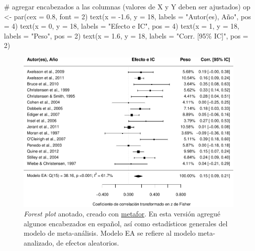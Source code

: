 \documentclass[
  bookmarksnumbered]{article}
\newenvironment{Shaded}{\begin{snugshade}}{\end{snugshade}}
\newcommand{\AttributeTok}[1]{\textcolor[rgb]{0.00,0.34,0.68}{#1}}
\newcommand{\CommentTok}[1]{\textcolor[rgb]{0.54,0.53,0.53}{#1}}
\newcommand{\DecValTok}[1]{\textcolor[rgb]{0.69,0.50,0.00}{#1}}
\newcommand{\FloatTok}[1]{\textcolor[rgb]{0.69,0.50,0.00}{#1}}
\newcommand{\FunctionTok}[1]{\textcolor[rgb]{0.39,0.29,0.61}{#1}}
\newcommand{\NormalTok}[1]{\textcolor[rgb]{0.12,0.11,0.11}{#1}}
\newcommand{\OtherTok}[1]{\textcolor[rgb]{0.00,0.43,0.16}{#1}}
\newcommand{\SpecialCharTok}[1]{\textcolor[rgb]{0.24,0.68,0.91}{#1}}
\newcommand{\StringTok}[1]{\textcolor[rgb]{0.75,0.01,0.01}{#1}}
\begin{document}
\begin{Shaded}
\begin{Highlighting}[]
\CommentTok{\# agregar encabezados a las columnas (valores de X y Y deben ser ajustados)}
\NormalTok{op }\OtherTok{\textless{}{-}} \FunctionTok{par}\NormalTok{(}\AttributeTok{cex =} \FloatTok{0.8}\NormalTok{, }\AttributeTok{font =} \DecValTok{2}\NormalTok{) }
\FunctionTok{text}\NormalTok{(}\AttributeTok{x =} \SpecialCharTok{{-}}\FloatTok{1.6}\NormalTok{, }\AttributeTok{y =} \DecValTok{18}\NormalTok{, }\AttributeTok{labels =} \StringTok{"Autor(es), Año"}\NormalTok{, }\AttributeTok{pos =} \DecValTok{4}\NormalTok{)}
\FunctionTok{text}\NormalTok{(}\AttributeTok{x =} \DecValTok{0}\NormalTok{, }\AttributeTok{y =} \DecValTok{18}\NormalTok{, }\AttributeTok{labels =} \StringTok{"Efecto e IC"}\NormalTok{, }\AttributeTok{pos =} \DecValTok{4}\NormalTok{)}
\FunctionTok{text}\NormalTok{(}\AttributeTok{x =} \DecValTok{1}\NormalTok{, }\AttributeTok{y =} \DecValTok{18}\NormalTok{, }\AttributeTok{labels =} \StringTok{"Peso"}\NormalTok{, }\AttributeTok{pos =} \DecValTok{2}\NormalTok{)}
\FunctionTok{text}\NormalTok{(}\AttributeTok{x =} \FloatTok{1.6}\NormalTok{, }\AttributeTok{y =} \DecValTok{18}\NormalTok{, }\AttributeTok{labels =} \StringTok{"Corr. [95\% IC]"}\NormalTok{, }\AttributeTok{pos =} \DecValTok{2}\NormalTok{)}
\end{Highlighting}
\end{Shaded}

\begin{figure}
\centering
\includegraphics{Meta-analysis_files/figure-latex/for-plot2-1.pdf}
\caption{\label{fig:for-plot2}\emph{Forest plot} anotado, creado con \href{https://www.metafor-project.org/doku.php}{metafor}. En esta versión agregué algunos encabezados en español, así como estadísticos generales del modelo de meta-análisis. Modelo EA se refiere al modelo meta-analizado, de efectos aleatorios.}
\end{figure}
\end{document}
